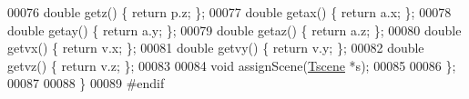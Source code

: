 \begin{DoxyCode}
00076                 \textcolor{keywordtype}{double} getz() \{ \textcolor{keywordflow}{return} p.z; \};                    
00077                 \textcolor{keywordtype}{double} getax() \{ \textcolor{keywordflow}{return} a.x; \};                   
00078                 \textcolor{keywordtype}{double} getay() \{ \textcolor{keywordflow}{return} a.y; \};                   
00079                 \textcolor{keywordtype}{double} getaz() \{ \textcolor{keywordflow}{return} a.z; \};                   
00080                 \textcolor{keywordtype}{double} getvx() \{ \textcolor{keywordflow}{return} v.x; \};                   
00081                 \textcolor{keywordtype}{double} getvy() \{ \textcolor{keywordflow}{return} v.y; \};                   
00082                 \textcolor{keywordtype}{double} getvz() \{ \textcolor{keywordflow}{return} v.z; \};                   
00083                 
00084                 \textcolor{keywordtype}{void} assignScene(\hyperlink{classPed_1_1Tscene}{Tscene} *s);
00085                 
00086         \};
00087         
00088 \}
00089 \textcolor{preprocessor}{#endif}
\end{DoxyCode}
